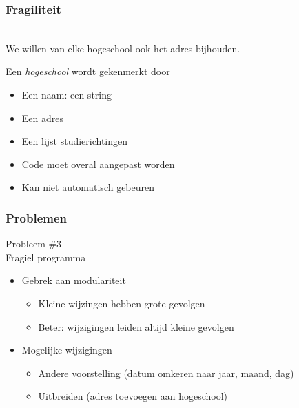 \begin{frame}
  \frametitle{Fragiliteit}
   \\
  We willen van elke hogeschool ook het adres bijhouden.

  \vskip4mm
  \begin{center}
    \begin{minipage}{.7\linewidth}
      Een \emph{hogeschool} wordt gekenmerkt door
      \begin{itemize}
        \item Een naam: een string
        \item \alert{Een adres}
        \item Een lijst studierichtingen
      \end{itemize}
    \end{minipage}
  \end{center}

  \vskip4mm
  \begin{itemize}
    \item Code moet overal aangepast worden
    \item Kan niet automatisch gebeuren
  \end{itemize}
\end{frame}



\begin{frame}
  \frametitle{Problemen}
  \begin{center} 
    {\Huge Probleem \#3} \\[4mm]
    {\Large Fragiel programma}
  \end{center}
  \begin{itemize}
    \item Gebrek aan modulariteit
          \begin{itemize}
            \item Kleine wijzingen hebben grote gevolgen
            \item Beter: wijzigingen leiden altijd kleine gevolgen
          \end{itemize}
    \item Mogelijke wijzigingen
          \begin{itemize}
            \item Andere voorstelling (datum omkeren naar jaar, maand, dag)
            \item Uitbreiden (adres toevoegen aan hogeschool)
          \end{itemize}
  \end{itemize}
\end{frame}


